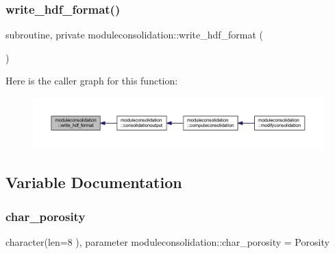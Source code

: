 \subsubsection{\texorpdfstring{write\+\_\+hdf\+\_\+format()}{write\_hdf\_format()}}
{\footnotesize\ttfamily subroutine, private moduleconsolidation\+::write\+\_\+hdf\+\_\+format (\begin{DoxyParamCaption}{ }\end{DoxyParamCaption})\hspace{0.3cm}{\ttfamily [private]}}

Here is the caller graph for this function\+:\nopagebreak
\begin{figure}[H]
\begin{center}
\leavevmode
\includegraphics[width=350pt]{namespacemoduleconsolidation_ae7ca7200e9ac29d962cff15374878a4e_icgraph}
\end{center}
\end{figure}


\subsection{Variable Documentation}
\mbox{\label{namespacemoduleconsolidation_a5c123194ad718ebaf0fe7466ca4d7c82}} 
\subsubsection{\texorpdfstring{char\+\_\+porosity}{char\_porosity}}
{\footnotesize\ttfamily character(len=8 ), parameter moduleconsolidation\+::char\+\_\+porosity = \textquotesingle{}Porosity\textquotesingle{}\hspace{0.3cm}{\ttfamily [private]}}

\mbox{\label{namespacemoduleconsolidation_a2a32335f2940d1ba0a8488797e504295}} 
